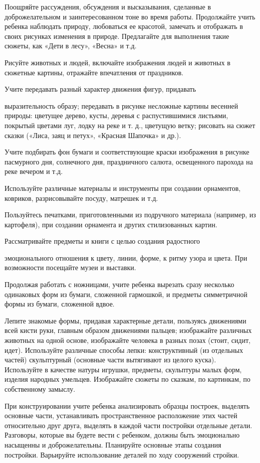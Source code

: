 \documentclass{book}
\begin{document}
Поощряйте рассуждения, обсуждения и высказывания, сделанные в
доброжелательном и заинтересованном тоне во время работы. Продолжайте
учить ребенка наблюдать природу, любоваться ее красотой, замечать и
отображать в своих рисунках изменения в природе. Предлагайте для
выполнения такие сюжеты, как «Дети в лесу», «Весна» и т.д.

Рисуйте животных и людей, включайте изображения людей и животных в
сюжетные картины, отражайте впечатления от праздников.

Учите передавать разный характер движения фигур, придавать

выразительность образу; передавать в рисунке несложные картины весенней
природы: цветущее дерево, кусты, деревья с распустившимися листьями,
покрытый цветами луг, лодку на реке и т. д., цветущую ветку; рисовать на
сюжет сказки («Лиса, заяц и петух», «Красная Шапочка» и др.).

Учите подбирать фон бумаги и соответствующие краски изображения в
рисунке пасмурного дня, солнечного дня, праздничного салюта, освещенного
парохода на реке вечером и т.д.

Используйте различные материалы и инструменты при создании орнаментов,
ковриков, разрисовывайте посуду, матрешек и т.д.

Пользуйтесь печатками, приготовленными из подручного материала
(например, из картофеля), при создании орнамента и других стилизованных
картин.

Рассматривайте предметы и книги с целью создания радостного

эмоционального отношения к цвету, линии, форме, к ритму узора и цвета.
При возможности посещайте музеи и выставки.

Продолжая работать с ножницами, учите ребенка вырезать сразу несколько
одинаковых форм из бумаги, сложенной гармошкой, и предметы симметричной
формы из бумаги, сложенной вдвое.

Лепите знакомые формы, придавая характерные детали, пользуясь движениями
всей кисти руки, главным образом движениями пальцев; изображайте
различных животных на одной основе, изображайте человека в разных позах
(стоит, сидит, идет). Используйте различные способы лепки:
конструктивный (из отдельных частей) скульптурный (основные части
вытягивают из целого куска). Используйте в качестве натуры игрушки,
предметы, скульптуры малых форм, изделия народных умельцев. Изображайте
сюжеты по сказкам, по картинкам, по собственному замыслу.

При конструировании учите ребенка анализировать образцы построек,
выделять основные части, устанавливать пространственное расположение
этих частей относительно друг друга, выделять в каждой части постройки
отдельные детали. Разговоры, которые вы будете вести с ребенком, должны
быть эмоционально насыщенны и доброжелательны. Планируйте основные этапы
создания постройки. Варьируйте использование деталей по ходу сооружений
стройки.
\end{document}
